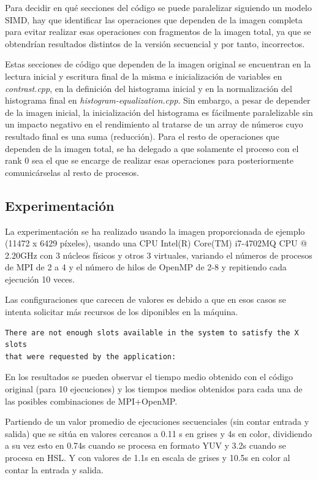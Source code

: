 \documentclass[12pt]{report} %
\begin{document}
Para decidir en qué secciones del código se puede paralelizar siguiendo un modelo SIMD, hay que identificar
las operaciones que dependen de la imagen completa para evitar realizar esas operaciones con fragmentos de
la imagen total, ya que se obtendrían resultados distintos de la versión secuencial y por tanto, incorrectos.

Estas secciones de código que dependen de la imagen original se encuentran en la lectura inicial y escritura
final de la misma e inicialización de variables en \textit{contrast.cpp}, en la definición del histograma
inicial y en la normalización del histograma final en \textit{histogram-equalization.cpp}. Sin embargo,
a pesar de depender de la imagen inicial, la inicialización del histograma es fácilmente paralelizable sin
un impacto negativo en el rendimiento al tratarse de un array de números cuyo resultado final es una suma (reducción).
Para el resto de operaciones que dependen de la imagen total, se ha delegado a que solamente el proceso
con el rank 0 sea el que se encarge de realizar esas operaciones para posteriormente comunicárselas al
resto de procesos.

\subsection{Experimentación}

La experimentación se ha realizado usando la imagen proporcionada de ejemplo (11472 x 6429 píxeles),
usando una CPU Intel(R) Core(TM) i7-4702MQ CPU @ 2.20GHz con 3 núcleos físicos y otros 3 virtuales, variando
el números de procesos de MPI de 2 a 4 y el número de hilos de OpenMP de 2-8 y repitiendo cada ejecución 10 veces.

Las configuraciones que carecen de valores es debido a que en esos casos se intenta solicitar más recursos de los diponibles en la máquina.

\begin{verbatim}
There are not enough slots available in the system to satisfy the X slots
that were requested by the application:
\end{verbatim}

En los resultados se pueden observar el tiempo medio obtenido con el código original (para 10 ejecuciones)
y los tiempos medios obtenidos para cada una de las posibles combinaciones de MPI+OpenMP.

Partiendo de un valor promedio de ejecuciones secuenciales (sin contar entrada y salida) que se sitúa en
valores cercanos a 0.11 s en grises y 4s en color, dividiendo a su vez esto en 0.74s cuando se procesa
en formato YUV y 3.2s cuando se procesa en HSL. Y con valores de 1.1s en escala de grises y 10.5s en color al contar la entrada y salida.
\end{document}
